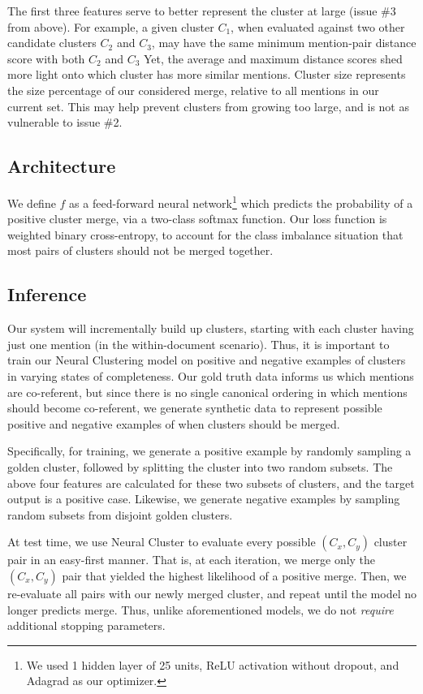 \documentclass[11pt,a4paper]{article}
\begin{document}
The first three features serve to better represent the cluster at large (issue \#3 from above).  For example, a given cluster $C_1$, when evaluated against two other candidate clusters $C_2$ and $C_3$, may have the same minimum mention-pair distance score with both $C_2$ and $C_3$  Yet, the average and maximum distance scores shed more light onto which cluster has more similar mentions. Cluster size represents the size percentage of our considered merge, relative to all mentions in our current set.  This may help prevent clusters from growing too large, and is not as vulnerable to issue \#2.

\subsection{Architecture}
We define $f$ as a feed-forward neural network\footnote{We used 1 hidden layer of 25 units, ReLU activation without dropout, and Adagrad as our optimizer.} which predicts the probability of a positive cluster merge, via a two-class softmax function.  Our loss function is weighted binary cross-entropy, to account for the class imbalance situation that most pairs of clusters should not be merged together.  

\subsection{Inference}
Our system will incrementally build up clusters, starting with each cluster having just one mention (in the within-document scenario).  Thus, it is important to train our Neural Clustering model on positive and negative examples of clusters in varying states of completeness.  Our gold truth data informs us which mentions are co-referent, but since there is no single canonical ordering in which mentions should become co-referent, we generate synthetic data to represent possible positive and negative examples of when clusters should be merged.

Specifically, for training, we generate a positive example by randomly sampling a golden cluster, followed by splitting the cluster into two random subsets.  The above four features are calculated for these two subsets of clusters, and the target output is a positive case.  Likewise, we generate negative examples by sampling random subsets from disjoint golden clusters.

At test time, we use Neural Cluster to evaluate every possible $(C_x, C_y)$ cluster pair in an easy-first manner.  That is, at each iteration, we merge only the $(C_x,C_y)$ pair that yielded the highest likelihood of a positive merge.  Then, we re-evaluate all pairs with our newly merged cluster, and repeat until the model no longer predicts merge.  Thus, unlike aforementioned models, we do not \textit{require} additional stopping parameters.
\end{document}
